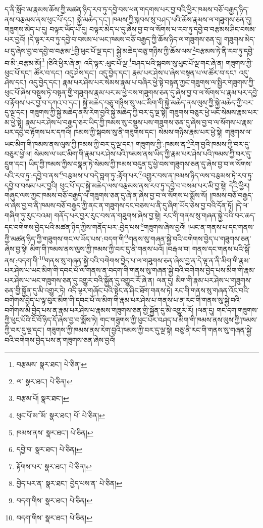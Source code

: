 ད་ནི་སློབ་མ་རྣམས་ཆོས་ཀྱི་མཚན་ཉིད་རབ་ཏུ་དབྱེ་བས་ཕན་གདགས་པར་བྱ་བའི་ཕྱིར་ཁམས་བཅོ་བརྒྱད་ཉིད་ནས་བརྩམས་ནས་ཕུང་པོ་དང་། སྐྱེ་མཆེད་དང་། ཁམས་ཀྱི་སྐབས་སུ་བཤད་པའི་ཆོས་རྣམས་ལ་གཟུགས་ཅན་དུ། གཟུགས་མེད་པ་དུ། བལྟར་ཡོད་པ་དུ། བལྟར་མེད་པ་དུ་ཞེས་བྱ་བ་ལ་སོགས་པ་རབ་ཏུ་དབྱེ་བ་བརྩམས་ཤིང་བསམ་པར་བྱའོ། །དེ་ལྟར་རབ་ཏུ་དབྱེ་བ་བསམ་པ་ཡང་ཁམས་བཅོ་བརྒྱད་ཀྱི་ཆོས་ཉིད་ལ་གཟུགས་ཅན་དུ། གཟུགས་མེད་པ་དུ་ཞེས་བྱ་བ་དབྱེ་བ་བརྩམ་\footnote{བརྩམས་  སྣར་ཐང་།  པེ་ཅིན། }གྱི་ཕུང་པོ་ལྔ་དང་། སྐྱེ་མཆེད་བཅུ་གཉིས་ཀྱི་ཆོས་ལས་\footnote{ལ་  སྣར་ཐང་།  པེ་ཅིན། }བརྩམས་ཏེ་ནི་རབ་ཏུ་དབྱེ་བ་མི་:བརྩམ་མོ།\footnote{བརྩམ་པོ།  སྣར་ཐང་། } །ཅིའི་ཕྱིར་ཞེ་ན། འདི་ལྟར་:ཕུང་པོ་ལྔ་\footnote{ཕུང་པོ་མ་ོ་མ་  སྣར་ཐང་། པོ་  པེ་ཅིན། }བཤད་པའི་སྐབས་སུ་ཕུང་པོ་ལྔ་གང་ཞེ་ན། གཟུགས་ཀྱི་ཕུང་པོ་དང་། ཚོར་བ་དང་། འདུ་ཤེས་དང་། འདུ་བྱེད་དང་། རྣམ་པར་ཤེས་པ་ཞེས་བསྟན་པ་ལ་ཚོར་བ་དང་། འདུ་ཤེས་དང་། འདུ་བྱེད་དང་། རྣམ་པར་ཤེས་པར་སེམས་རྣམ་པ་བཞིར་ཕྱེ་སྟེ་བསྟན་ཀྱང་གཟུགས་ལ་སྤྱིར་གཟུགས་ཀྱི་ཕུང་པོ་ཞེས་བསྡུས་ཏེ་བསྟན་གྱི་གཟུགས་རྣམ་པར་མ་ཕྱེ་བས་གཟུགས་ཅན་དུ་ཞེས་བྱ་བ་ལ་སོགས་པ་རྣམ་པར་དབྱེ་བ་རྟོགས་པར་བྱ་བ་དཀའ་བ་དང་། སྐྱེ་མཆེད་བཅུ་གཉིས་སུ་ཡང་མིག་གི་སྐྱེ་མཆེད་ནས་ལུས་ཀྱི་སྐྱེ་མཆེད་ཀྱི་བར་དུ་ལྔ་དང་། གཟུགས་ཀྱི་སྐྱེ་མཆེད་ནས་རེག་བྱའི་སྐྱེ་མཆེད་ཀྱི་བར་དུ་ལྔ་སྟེ། གཟུགས་བཅུར་ཕྱེ་ཡང་སེམས་རྣམ་པར་མ་ཕྱེ་སྟེ། རྣམ་པར་ཤེས་པ་བརྒྱད་ཅར་ཡིད་ཀྱི་ཁམས་སུ་བསྡུས་པས་གཟུགས་ཅན་དུ་ཞེས་བྱ་བ་ལ་སོགས་པ་རྣམ་པར་དབྱེ་བ་རྟོགས་པར་དཀའི། ཁམས་ཀྱི་སྐབས་སུ་ནི་གཟུགས་དང་། སེམས་གཉིས་རྣམ་པར་ཕྱེ་སྟེ། གཟུགས་ལ་ཡང་མིག་གི་ཁམས་ནས་ལུས་ཀྱི་ཁམས་ཀྱི་བར་དུ་ལྔ་དང་། གཟུགས་ཀྱི་:ཁམས་ན་\footnote{ཁམས་ནས་  སྣར་ཐང་།  པེ་ཅིན། }རེག་བྱའི་ཁམས་ཀྱི་བར་དུ་བཅུར་ཕྱེ་ལ། སེམས་ལ་ཡང་མིག་གི་རྣམ་པར་ཤེས་པའི་ཁམས་ནས་ཡིད་ཀྱི་རྣམ་པར་ཤེས་པའི་ཁམས་ཀྱི་བར་དུ་དྲུག་དང་། ཡིད་ཀྱི་ཁམས་ཀྱིས་བསྣན་ཏེ་སེམས་ཀྱི་ཁམས་བདུན་དུ་ཕྱེ་བས་གཟུགས་ཅན་དུ་ཞེས་བྱ་བ་ལ་སོགས་པའི་རབ་ཏུ་:དབྱེ་བ་ནས་\footnote{དབྱེ་བ་  སྣར་ཐང་།  པེ་ཅིན། }བརྩམས་པ་བདེ་བླག་ཏུ་:རྟོག་པར་\footnote{རྟོགས་པར་  སྣར་ཐང་།  པེ་ཅིན། }འགྱུར་བས་ན་ཁམས་ཉིད་ལས་བརྩམས་ཏེ་རབ་ཏུ་དབྱེ་བ་བསམ་པར་བྱའི། ཕུང་པོ་དང་སྐྱེ་མཆེད་ལས་བརྩམས་ནས་རབ་ཏུ་དབྱེ་བ་བསམ་པར་མི་བྱ་སྟེ། དེའི་ཕྱིར། གཞུང་ལས་ཀྱང་ཁམས་བཅོ་བརྒྱད་ལ་གཟུགས་ཅན་དུ་ཞེ་ན་ཞེས་བྱ་བ་ལ་སོགས་པ་སྨོས་སོ། །ཁམས་བཅོ་བརྒྱད་ལ་ཞེས་བྱ་བ་ནི་ཁམས་བཅོ་བརྒྱད་ཀྱི་ནང་ན་གཟུགས་དང་བཅས་པ་ནི་དུ་ཞིག་ཡོད་ཅེས་བྱ་བའི་དོན་ཏོ། །དེ་ལ་གཞིག་ཏུ་རུང་བའམ། གནོད་པར་བྱར་རུང་བས་ན་གཟུགས་ཞེས་བྱ་སྟེ། རང་གི་གནས་སུ་གཞན་སྐྱེ་བའི་བར་ཆད་དང་བགེགས་བྱེད་པའི་མཚན་ཉིད་ཀྱིས་གནོད་པར་:བྱེད་པས་\footnote{བྱེད་པར་ན་  སྣར་ཐང་། བྱེད་པས་ན་  པེ་ཅིན། }གཟུགས་ཞེས་བྱའོ། །ཡང་ན་གནས་པ་དང་གནས་ཀྱི་མཚན་ཉིད་ཀྱི་གཟུགས་གང་ལ་ཡོད་པས་:བདག་གི་\footnote{བདག་གིས་  སྣར་ཐང་།  པེ་ཅིན། }གནས་སུ་གཞན་སྐྱེ་བའི་བགེགས་བྱེད་པ་གཟུགས་ཅན་ཞེས་བྱ་སྟེ། མིག་གི་ཁམས་ནས་ལུས་ཀྱི་ཁམས་ཀྱི་བར་དུ་ནི་གནས་པའོ། །བརྒལ་བ། གནས་དང་གནས་པའི་སྒོ་ནས་:བདག་གི་\footnote{བདག་གིས་  སྣར་ཐང་།  པེ་ཅིན། }གནས་སུ་གཞན་སྐྱེ་བའི་བགེགས་བྱེད་པ་ལ་གཟུགས་ཅན་ཞེས་བྱ་ན་དེ་ལྟ་ན་ནི་མིག་གི་རྣམ་པར་ཤེས་པ་ཡང་མིག་གི་དབང་པོ་ལ་གནས་ན་བདག་གི་གནས་སུ་གཞན་སྐྱེ་བའི་བགེགས་བྱེད་པས་མིག་གི་རྣམ་པར་ཤེས་པ་ཡང་གཟུགས་ཅན་དུ་འགྱུར་བའི་སྐྱོན་དུ་འགྱུར་རོ་ཞེ་ན། ལན་དུ། མིག་གི་རྣམ་པར་ཤེས་པ་གཟུགས་ཅན་གྱི་སྐྱོན་དུ་མི་འགྱུར་ཏེ། འདི་ལྟར་གཞོང་པའི་སྟེང་ན་ཤིང་ཐོག་གནས་ཏེ། རང་གི་གནས་སུ་གཞན་འོང་བའི་བགེགས་བྱེད་པ་ལྟ་བུར་མིག་གི་དབང་པོ་ལ་མིག་གི་རྣམ་པར་ཤེས་པ་གནས་པ་ན་རང་གི་གནས་སུ་སྐྱེ་བའི་བགེགས་མི་བྱེད་པས་ན་རྣམ་པར་ཤེས་པ་རྣམས་གཟུགས་ཅན་གྱི་སྐྱོན་དུ་མི་འགྱུར་རོ། །ལན་དུ། གང་དག་གཟུགས་ཀྱི་ཕུང་པོའི་ངོ་བོ་ཉིད་དོ་ཞེས་བྱ་བ་སྨོས་ཏེ། གང་གཟུགས་ཀྱི་ཕུང་པོར་བཤད་པ་མིག་གི་ཁམས་ནས་ལུས་ཀྱི་ཁམས་ཀྱི་བར་དུ་ལྔ་དང་། གཟུགས་ཀྱི་ཁམས་ནས་རེག་བྱའི་ཁམས་ཀྱི་བར་དུ་ལྔ་སྟེ། བཅུ་ནི་རང་གི་གནས་སུ་གཞན་སྐྱེ་བའི་བགེགས་བྱེད་པས་ན་གཟུགས་ཅན་ཞེས་བྱའོ། 